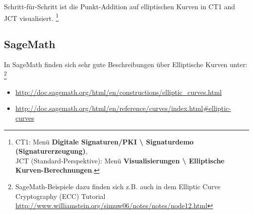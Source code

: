 \begin{refsegment}
Schritt-für-Schritt ist die Punkt-Addition auf elliptischen Kurven
in CT1 and JCT visualisiert.%
\footnote{%
  CT1: Menü \textbf{Digitale Signaturen/PKI \textbackslash{} Signaturdemo
  (Signaturerzeugung)},\\
  JCT (Standard-Perspektive): Menü \textbf{Visualisierungen \textbackslash{}
  Elliptische Kurven-Berechnungen}.

}


\subsection{SageMath}
\label{ec:Sage_Massierer}

In SageMath finden sich sehr gute Beschreibungen über Elliptische Kurven unter:%
\footnote{%
SageMath-Beispiele dazu finden sich z.B. auch in
%
  dem \glqq Elliptic Curve Cryptography (ECC) Tutorial\grqq\\
  \url{http://www.williamstein.org/simuw06/notes/notes/node12.html}

}

\begin{sloppypar} %
\begin{itemize}
    \item \url{http://doc.sagemath.org/html/en/constructions/elliptic_curves.html}
    \item \url{http://doc.sagemath.org/html/en/reference/curves/index.html#elliptic-curves}
\end{itemize}
\end{sloppypar}



\end{refsegment}
